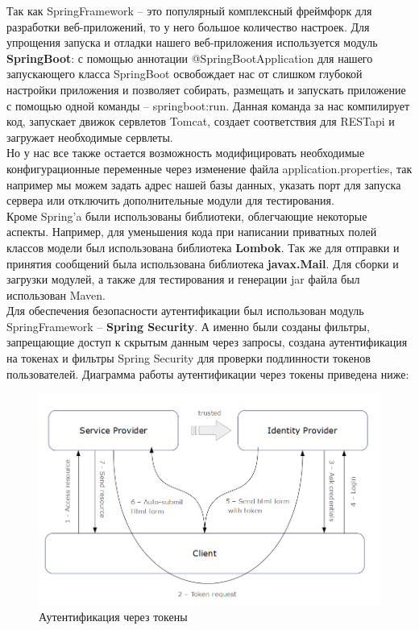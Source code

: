 \documentclass{article}
\begin{document}
Так как SpringFramework -- это популярный комплексный фреймфорк для разработки веб-приложений, то у него большое количество настроек. Для упрощения запуска и отладки нашего веб-приложения используется модуль \textbf{SpringBoot}: с помощью аннотации @SpringBootApplication для нашего запускающего класса SpringBoot освобождает нас от слишком глубокой настройки приложения и позволяет собирать, размещать и запускать приложение с помощью одной команды -- springboot:run. Данная команда за нас компилирует код, запускает движок сервлетов Tomcat, создает соответствия для RESTapi и загружает необходимые сервлеты. \\

Но у нас все также остается возможность модифицировать необходимые конфигурационные переменные через изменение файла application.properties, так например мы можем задать адрес нашей базы данных, указать порт для запуска сервера или отключить дополнительные модули для тестирования.  \\

Кроме Spring'a были использованы библиотеки, облегчающие некоторые аспекты. Например, для уменьшения кода при написании приватных полей классов модели был использована библиотека \textbf{Lombok}. Так же для отправки и принятия сообщений была использована библиотека \textbf{javax.Mail}. Для сборки и загрузки модулей, а также для тестирования и генерации jar файла был использован Maven. \\

Для обеспечения безопасности аутентификации был использован модуль SpringFramework -- \textbf{Spring Security}. А именно были созданы фильтры, запрещающие доступ к скрытым данным через запросы, создана аутентификация на токенах и фильтры Spring Security для проверки подлинности токенов пользователей. Диаграмма работы аутентификации через токены приведена ниже: 

\begin{figure}[H]
        \begin{flushleft}
            \centerline{\includegraphics[scale=0.6]{tokenauth.png}}
            \caption{Аутентификация через токены}
        \end{flushleft}
\end{figure}
\end{document}
